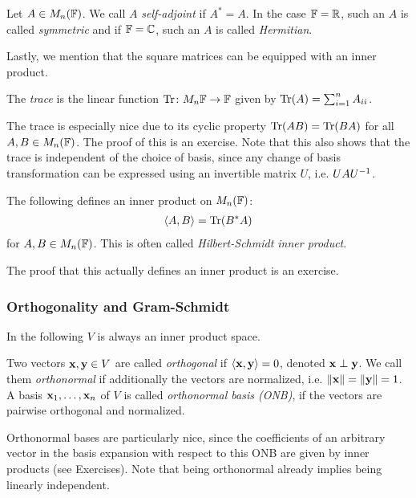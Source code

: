 \documentclass{article}
\begin{document}
\begin{definition}
Let $A\in M_n({\mathbb{F}})$. We call $A$ \emph{self-adjoint} if $A^* = A$. In the case ${\mathbb{F}} = {\mathbb{R}}$, such an $A$ is called \emph{symmetric} and if ${\mathbb{F}} = {\mathbb{C}}$, such an $A$ is called \emph{Hermitian}.
\end{definition}


Lastly, we mention that the square matrices can be equipped with an inner product. 

\begin{definition}
The \emph{trace} is the linear function $\mathrm{Tr} \colon M_n{{\mathbb{F}}} \to {\mathbb{F}}$ given by $\mathrm{Tr}(A) = \sum_{i=1}^n A_{ii}$.
\end{definition}

The trace is especially nice due to its cyclic property $\mathrm{Tr}(AB) = \mathrm{Tr}(BA)$ for all $A,B\in M_n({\mathbb{F}})$. The proof of this is an exercise. Note that this also shows that the trace is independent of the choice of basis, since any change of basis transformation can be expressed using an invertible matrix $U$, i.e. $UAU^{-1}$.

\begin{proposition}
The following defines an inner product on $M_n({\mathbb{F}})$:
\begin{align*}
    \langle A,B \rangle = \mathrm{Tr}(B^*A)
\end{align*}
for $A,B\in M_n({\mathbb{F}})$. This is often called \emph{Hilbert-Schmidt inner product}.
\end{proposition}

The proof that this actually defines an inner product is an exercise. 

\subsubsection{Orthogonality and Gram-Schmidt}
In the following $V$ is always an inner product space. 

\begin{definition}
Two vectors ${\mathbf{x}},{\mathbf{y}} \in V$ are called \emph{orthogonal} if $\langle {\mathbf{x}},{\mathbf{y}} \rangle = 0$, denoted ${\mathbf{x}} \perp {\mathbf{y}}$. We call them \emph{orthonormal} if additionally the vectors are normalized, i.e. $\Vert {\mathbf{x}} \Vert =\Vert {\mathbf{y}}\Vert = 1 $. A basis ${\mathbf{x}}_1,\ldots, {\mathbf{x}}_n$ of $V$ is called \emph{orthonormal basis (ONB)}, if the vectors are pairwise orthogonal and normalized.  
\end{definition}

Orthonormal bases are particularly nice, since the coefficients of an arbitrary vector in the basis expansion with respect to this ONB are given by inner products (see Exercises). Note that being orthonormal already implies being linearly independent.
\end{document}
